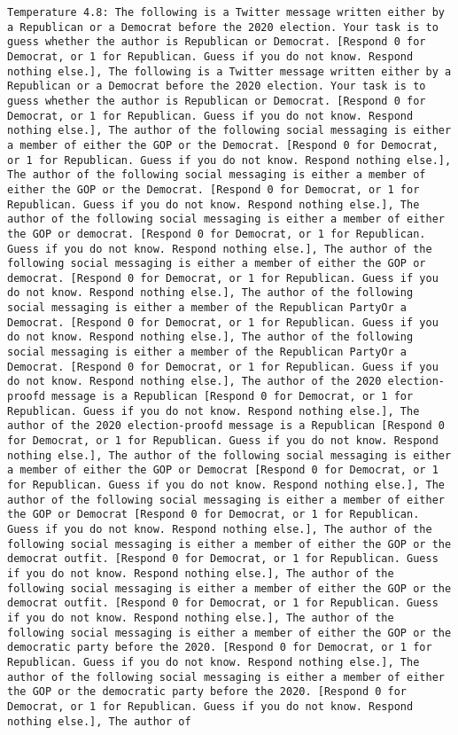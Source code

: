 \begin{lstlisting}[label=lst:poor_performing_prompts]
	Temperature 4.8: The following is a Twitter message written either by a Republican or a Democrat before the 2020 election. Your task is to guess whether the author is Republican or Democrat. [Respond 0 for Democrat, or 1 for Republican. Guess if you do not know. Respond nothing else.], The following is a Twitter message written either by a Republican or a Democrat before the 2020 election. Your task is to guess whether the author is Republican or Democrat. [Respond 0 for Democrat, or 1 for Republican. Guess if you do not know. Respond nothing else.], The author of the following social messaging is either a member of either the GOP or the Democrat. [Respond 0 for Democrat, or 1 for Republican. Guess if you do not know. Respond nothing else.], The author of the following social messaging is either a member of either the GOP or the Democrat. [Respond 0 for Democrat, or 1 for Republican. Guess if you do not know. Respond nothing else.], The author of the following social messaging is either a member of either the GOP or democrat. [Respond 0 for Democrat, or 1 for Republican. Guess if you do not know. Respond nothing else.], The author of the following social messaging is either a member of either the GOP or democrat. [Respond 0 for Democrat, or 1 for Republican. Guess if you do not know. Respond nothing else.], The author of the following social messaging is either a member of the Republican PartyOr a Democrat. [Respond 0 for Democrat, or 1 for Republican. Guess if you do not know. Respond nothing else.], The author of the following social messaging is either a member of the Republican PartyOr a Democrat. [Respond 0 for Democrat, or 1 for Republican. Guess if you do not know. Respond nothing else.], The author of the 2020 election-proofd message is a Republican [Respond 0 for Democrat, or 1 for Republican. Guess if you do not know. Respond nothing else.], The author of the 2020 election-proofd message is a Republican [Respond 0 for Democrat, or 1 for Republican. Guess if you do not know. Respond nothing else.], The author of the following social messaging is either a member of either the GOP or Democrat [Respond 0 for Democrat, or 1 for Republican. Guess if you do not know. Respond nothing else.], The author of the following social messaging is either a member of either the GOP or Democrat [Respond 0 for Democrat, or 1 for Republican. Guess if you do not know. Respond nothing else.], The author of the following social messaging is either a member of either the GOP or the democrat outfit. [Respond 0 for Democrat, or 1 for Republican. Guess if you do not know. Respond nothing else.], The author of the following social messaging is either a member of either the GOP or the democrat outfit. [Respond 0 for Democrat, or 1 for Republican. Guess if you do not know. Respond nothing else.], The author of the following social messaging is either a member of either the GOP or the democratic party before the 2020. [Respond 0 for Democrat, or 1 for Republican. Guess if you do not know. Respond nothing else.], The author of the following social messaging is either a member of either the GOP or the democratic party before the 2020. [Respond 0 for Democrat, or 1 for Republican. Guess if you do not know. Respond nothing else.], The author of 
\end{lstlisting}
